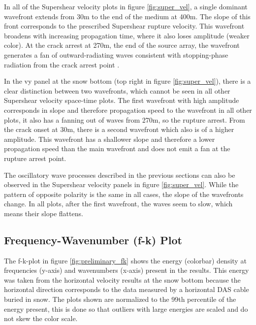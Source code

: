 In all of the Supershear velocity plots in figure \ref{fig:super_vel}, a single dominant wavefront extends from 30m to the end of the medium at 400m. The slope of this front corresponds to the prescribed Supershear rupture velocity. This wavefront broadens with increasing propagation time, where it also loses amplitude (weaker color). At the crack arrest at 270m, the end of the source array, the wavefront generates a fan of outward-radiating waves consistent with stopping-phase radiation from the crack arrest point \parencite{madariagaHighfrequencyRadiationCrack1977}. \par

In the vy panel at the snow bottom (top right in figure \ref{fig:super_vel}), there is a clear distinction between two wavefronts, which cannot be seen in all other Supershear velocity space-time plots. The first wavefront with high amplitude corresponds in slope and therefore propagation speed to the wavefront in all other plots, it also has a fanning out of waves from 270m, so the rupture arrest. From the crack onset at 30m, there is a second wavefront which also is of a higher amplitude. This wavefront has a shallower slope and therefore a lower propagation speed than the main wavefront and does not emit a fan at the rupture arrest point. \par

The oscillatory wave processes described in the previous sections can also be observed in the Supershear velocity panels in figure \ref{fig:super_vel}. While the pattern of opposite polarity is the same in all cases, the slope of the wavefronts change. In all plots, after the first wavefront, the waves seem to slow, which means their slope flattens. \par

\subsection{Frequency-Wavenumber (f-k) Plot}
\label{sec:fk_results}

The f-k-plot in figure \ref{fig:preliminary_fk} shows the energy (colorbar) density at frequencies (y-axis) and wavenumbers (x-axis) present in the results. This energy was taken from the horizontal velocity results at the snow bottom because the horizontal direction corresponds to the data measured by a horizontal DAS cable buried in snow. The plots shown are normalized to the 99th percentile of the energy present, this is done so that outliers with large energies are scaled and do not skew the color scale. 


